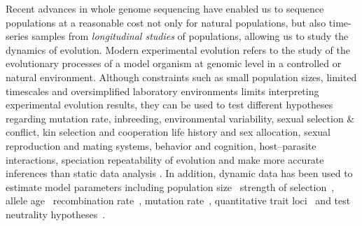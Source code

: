 \documentclass[11pt]{article}
\begin{document}
Recent advances in whole genome sequencing have enabled us to sequence
populations at a reasonable cost not only for natural populations, but
also time-series samples from \emph{longitudinal studies} of
populations, allowing us to study the dynamics of evolution. Modern
experimental evolution refers to the study of the evolutionary
processes of a model organism at genomic level in a controlled
\cite{hegreness2006equivalence,lang2013pervasive,orozco2012adaptation,
  lang2011genetic,barrick2009genome,bollback2007clonal,oz2014strength}
or natural
\cite{maldarelli2013hiv,reid2011new,denef2012situ,winters2012development,
  daniels2013genetic,barrett2008natural,bergland2014genomic}
environment.  Although constraints such as small population sizes,
limited timescales and oversimplified laboratory environments limits
interpreting experimental evolution results, they can be used to test
different hypotheses~\cite{kawecki2012experimental} regarding mutation
rate, inbreeding, environmental variability, sexual selection \&
conflict, kin selection and cooperation life history and sex
allocation, sexual reproduction and mating systems, behavior and
cognition, host–parasite interactions, speciation repeatability of
evolution and make more accurate inferences than static data analysis
\cite{boyko2008assessing,desai2008polymorphism,sawyer1992population}. In
addition, dynamic data has been used to estimate model parameters
including population
size~\cite{williamson1999using,wang2001pseudo,pollak1983new,waples1989generalized,
  Terhorst2015Multi} strength of
selection~\cite{mathieson2013estimating,illingworth2011distinguishing,Terhorst2015Multi,
  bollback2008estimation,illingworth2012quantifying,malaspinas2012estimating,
  Steinrücken2014a}, allele age~\cite{malaspinas2012estimating}
recombination rate~\cite{Terhorst2015Multi}, mutation
rate~\cite{Barrick2013Genome, Terhorst2015Multi}, quantitative trait
loci~\cite{baldwin2014power} and test neutrality
hypotheses~\cite{feder2014Identifying,Terhorst2015Multi,burke2010genome,bergland2014genomic}.
\end{document}
